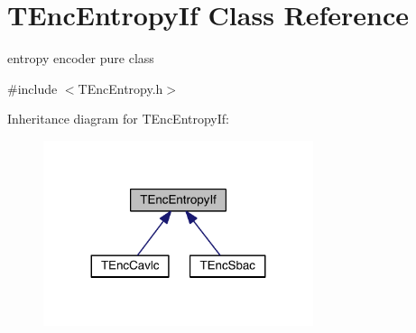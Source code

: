 \hypertarget{class_t_enc_entropy_if}{}\section{T\+Enc\+Entropy\+If Class Reference}
\label{class_t_enc_entropy_if}


entropy encoder pure class  




{\ttfamily \#include $<$T\+Enc\+Entropy.\+h$>$}



Inheritance diagram for T\+Enc\+Entropy\+If\+:
\nopagebreak
\begin{figure}[H]
\begin{center}
\leavevmode
\includegraphics[width=224pt]{da/d87/class_t_enc_entropy_if__inherit__graph}
\end{center}
\end{figure}

